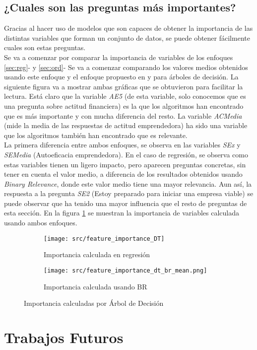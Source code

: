 \section{¿Cuales son las preguntas más importantes?}
Gracias al hacer uso de modelos que son capaces de obtener la importancia de las distintas variables que forman un conjunto de datos, se puede obtener fácilmente cuales son estas preguntas.\\
Se va a comenzar por comparar la importancia de variables de los enfoques \ref{sec:reg}- y \ref{sec:ord}-
Se va a comenzar comparando los valores medios obtenidos usando este enfoque y el enfoque propuesto en  y para árboles de decisión.
La siguiente figura va a mostrar ambas gráficas que se obtuvieron para facilitar la lectura.
Está claro que la variable \textit{AE5} (de esta variable, solo conocemos que es una pregunta sobre actitud financiera) es la que los algoritmos han encontrado que es más importante y con mucha diferencia del resto. La variable \textit{ACMedia} (mide la media de las respuestas de actitud emprendedora) ha sido una variable que los algoritmos también han encontrado que es relevante.\\
La primera diferencia entre ambos enfoques, se observa en las variables \textit{SEx} y \textit{SEMedia} (Autoeficacia emprendedora).
En el caso de regresión, se observa como estas variables tienen un ligero impacto, pero aparecen preguntas concretas, sin tener en cuenta el valor medio, a diferencia de los resultados obtenidos usando \textit{Binary Relevance}, donde este valor medio tiene una mayor relevancia. Aun así, la respuesta a la pregunta \textit{SE2} (Estoy preparado para iniciar una empresa viable) se puede observar que ha tenido una mayor influencia que el resto de preguntas de esta sección.
En la figura \ref{fig:dt_ft_cmp1} se muestran la importancia de variables calculada usando ambos enfoques.
\begin{figure}[H]
	\centering
	\begin{subfigure}[b]{\textwidth}
		\centering
		\texttt{[image: src/feature\_importance\_DT]}
		\caption{Importancia calculada en regresión}
	\end{subfigure}
	
	\begin{subfigure}[b]{\textwidth}
		\centering
		\texttt{[image: src/feature\_importance\_dt\_br\_mean.png]}
		\caption{Importancia calculada usando BR}
	\end{subfigure}
	\caption{Importancia calculadas por Árbol de Decisión}
	\label{fig:dt_ft_cmp1}
\end{figure}



\chapter{Trabajos Futuros}